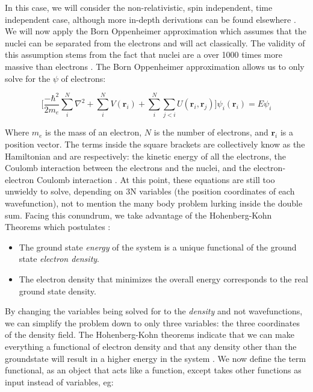 In this case, we will consider the non-relativistic, spin independent, time independent case, although more in-depth derivations can be found elsewhere \cite{tddft}.  We will now apply the Born Oppenheimer approximation which assumes that the nuclei can be separated from the electrons and will act classically. The validity of this assumption stems from the fact that nuclei are a  over 1000 times more massive than electrons \cite{graff_direct_1980}.  The Born Oppenheimer approximation allows us to only solve for the $\psi$ of electrons:

\begin{equation}
	\bigg[\frac{-\hbar^2}{2m_e}\sum_{i}^{N} \nabla^2 +\sum_{i}^{N} V(\textbf{r}_i) + \sum_{i}^{N}\sum_{j <i}U(\textbf{r}_i,\textbf{r}_j) \bigg] \psi_i(\textbf{r}_i) = E \psi_i
\end{equation}

Where $m_e$ is the mass of an electron, $N$ is the number of electrons, and $\textbf{r}_i$ is a position vector. The terms inside the square brackets are collectively know as the Hamiltonian and are respectively: the kinetic energy of all the electrons, the Coulomb interaction between the electrons and the nuclei, and the electron-electron Coulomb interaction  \cite{sholl_density_2009}. At this point, these equations are still too unwieldy to solve, depending on 3N variables (the position coordinates of each wavefunction), not to mention the many body problem lurking inside the double sum.  Facing this conundrum, we take advantage of the Hohenberg-Kohn Theorems which postulates \cite{hohenberg_inhomogeneous_1964}:
\begin{itemize}
	\item  The ground state \textit{energy} of the system is a unique functional of the ground state \textit{electron density}.
	\item The electron density that minimizes the overall energy corresponds to the real ground state density.  
\end{itemize}

By changing the variables being solved for to the \textit{density} and not wavefunctions, we can simplify the problem down to only three variables: the three coordinates of the density field.  The Hohenberg-Kohn theorems indicate that we can make everything a functional of electron density and that any density other than the groundstate will result in a higher energy in the system \cite{parr_density_1983}.  We now define the term functional, as an object that acts like a function, except takes other functions as input instead of variables, eg:

